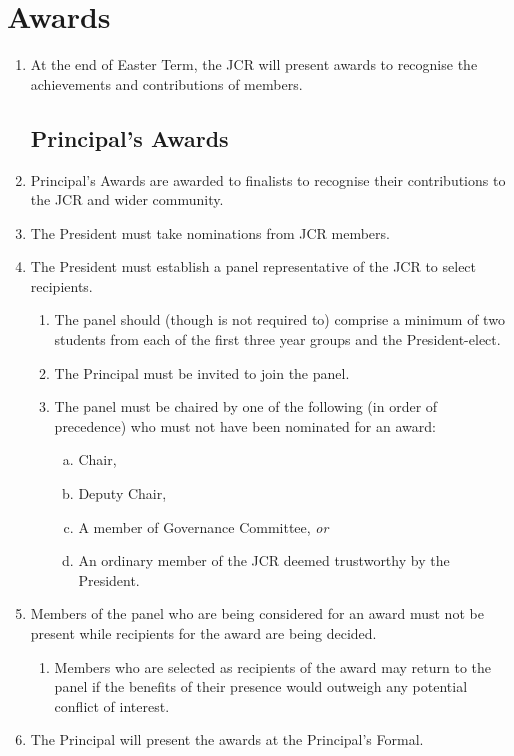 \documentclass[12pt]{article}
\begin{document}
\section{Awards}
\begin{enumerate}
    \item At the end of Easter Term, the JCR will present awards to recognise the achievements and contributions of members.
    \subsection{Principal's Awards}
    \item Principal's Awards are awarded to finalists to recognise their contributions to the JCR and wider community.
    \item The President must take nominations from JCR members.
    \item The President must establish a panel representative of the JCR to select recipients.
    \begin{enumerate}
        \item The panel should (though is not required to) comprise a minimum of two students from each of the first three year groups and the President-elect.
        \item The Principal must be invited to join the panel.
        \item The panel must be chaired by one of the following (in order of precedence) who must not have been nominated for an award:
        \begin{enumerate}[(a)]
            \item Chair,
            \item Deputy Chair,
            \item A member of Governance Committee, \emph{or}
            \item An ordinary member of the JCR deemed trustworthy by the President.
        \end{enumerate}
    \end{enumerate}
    \item Members of the panel who are being considered for an award must not be present while recipients for the award are being decided.
    \begin{enumerate}
        \item Members who are selected as recipients of the award may return to the panel if the benefits of their presence would outweigh any potential conflict of interest.
    \end{enumerate}
    \item The Principal will present the awards at the Principal's Formal.

\end{enumerate}
\end{document}
